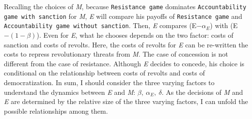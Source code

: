 \documentclass[11pt, letterpage]{article}
\begin{document}
Recalling the choices of \textit{M}, because \texttt{Resistance game} dominates \texttt{Accountability game with sanction} for \textit{M}, \textit{E} will compare his payoffs of \texttt{Resistance game} and \texttt{Accountability game without sanction}. Then, \textit{E} compares (E$-\alpha_{E}$) with (E$-(1-\beta)$). Even for \textit{E}, what he chooses depends on the two factor: costs of sanction and costs of revolts. Here, the costs of revolts for \textit{E} can be re-written the costs to repress revolutionary threats from \textit{M}. The case of concession is not different from the case of resistance. Although \textit{E} decides to concede, his choice is conditional on the relationship between costs of revolts and costs of democratization. In sum, I should consider the three varying factors to understand the dynamics between \textit{E} and \textit{M}: $\beta, \: \alpha_{E}, \: \delta$. As the decisions of \textit{M} and \textit{E} are determined by the relative size of the three varying factors, I can unfold the possible relationships among them.
\end{document}
